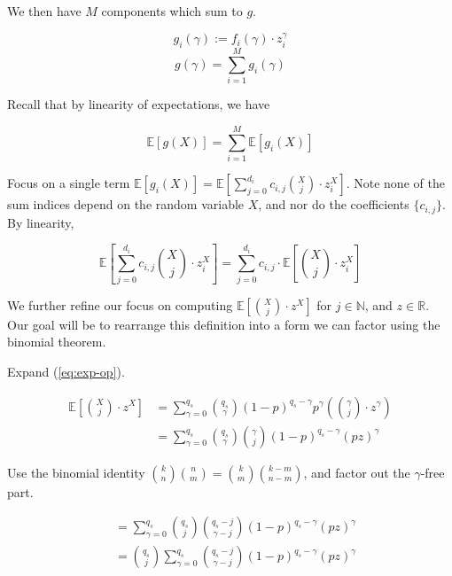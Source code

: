 \documentclass[11pt]{article}
\begin{document}
We then have $M$ components which sum to $g$.

\begin{equation}
  g_i(\gamma) := f_i(\gamma) \cdot z_i^\gamma
\end{equation}
\begin{equation}
  g(\gamma) = \sum_{i=1}^M g_i(\gamma)
\end{equation}

Recall that by linearity of expectations, we have

\begin{equation}
\label{eq:W-of-g}
  \mathbb E[g(X)] = \sum_{i=1}^M \mathbb E[g_i(X)]
\end{equation}

Focus on a single term $\mathbb E[g_i(X)] = \mathbb E \left[ \sum_{j=0}^{d_i} c_{i,j} \binom{X}{j} \cdot z_i^X \right]$. Note none of the sum indices depend on the random variable $X$, and nor do the coefficients $\{c_{i,j}\}$. By linearity,

\begin{equation}
   \mathbb E \left[ \sum_{j=0}^{d_i} c_{i,j} \binom{X}{j} \cdot z_i^X \right]
    = \sum_{j=0}^{d_i} c_{i,j} \cdot \mathbb E \left[ \binom{X}{j} \cdot z_i^X \right]
\end{equation}

We further refine our focus on computing $\mathbb E \left[ \binom{X}{j} \cdot z^X \right]$ for $j \in \mathbb N$, and $z \in \mathbb R$. Our goal will be to rearrange this definition into a form we can factor using the binomial theorem.

Expand (\ref{eq:exp-op}).

\begin{align}
  \mathbb E \left[ \binom{X}{j} \cdot z^X \right]
    &= \sum_{\gamma=0}^{q_s} \binom{q_s}{\gamma} (1 - p)^{q_s - \gamma} p^\gamma \left( \binom{\gamma}{j} \cdot z^\gamma \right) \\
    &= \sum_{\gamma=0}^{q_s} \binom{q_s}{\gamma} \binom{\gamma}{j} (1 - p)^{q_s - \gamma} (pz)^\gamma
\end{align}

Use the binomial identity $\binom{k}{n} \binom{n}{m} = \binom{k}{m} \binom{k-m}{n-m}$, and factor out the $\gamma$-free part.

\begin{align}
    &= \sum_{\gamma=0}^{q_s} \binom{q_s}{j} \binom{q_s - j}{\gamma - j} (1 - p)^{q_s - \gamma} (pz)^\gamma \\
    &= \binom{q_s}{j} \sum_{\gamma=0}^{q_s} \binom{q_s - j}{\gamma - j} (1 - p)^{q_s - \gamma} (pz)^\gamma
\end{align}
\end{document}
